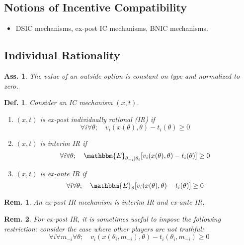 \documentclass[11pt,a4paper,dvipdfmx]{article}
\theoremstyle{plain}
\newtheorem{df}{Def.}[section]
\newtheorem{rem}{Rem.}[section]
\newtheorem{ass}{Ass.}
\newcommand{\E}{\mathbbm{E}}
\newcommand{\1}{\mathbbm{1}}
\begin{document}
\subsection{Notions of Incentive Compatibility}
\begin{itemize}
	\item DSIC mechanisms, ex-post IC mechanisms, BNIC mechanisms.
\end{itemize}

\subsection{Individual Rationality}
\begin{ass}
	The value of an outside option is constant on type and normalized to zero.
\end{ass}
\begin{df} Consider an IC mechanism $(x,t)$.
	\begin{enumerate}
		\item $(x,t)$ is ex-post individually rational (IR) if
		\[
		\forall i \forall \theta; \quad
		v_i(x(\theta), \theta) - t_i(\theta) \geq 0
		\]
		\item $(x,t)$ is interim IR if
		\[
		\forall i \forall \theta; \quad
		\E_{\theta_{-i} \mid \theta_i}[v_i(x(\theta), \theta) - t_i(\theta)] \geq 0
		\]
		\item $(x,t)$ is ex-ante IR if
		\[
		\forall i \forall \theta; \quad
		\E_{\theta}[v_i(x(\theta), \theta) - t_i(\theta)] \geq 0
		\]
	\end{enumerate}
\end{df}
\begin{rem}
	An ex-post IR mechanism is interim IR and ex-ante IR.
\end{rem}
\begin{rem}
	For ex-post IR, it is sometimes useful to impose the following restriction: consider the case where other players are not truthful:
	\[
	\forall i \forall m_{-i} \forall \theta; \quad
	v_i(x(\theta_i, m_{-i}), \theta) - t_i(\theta_i, m_{-i}) \geq 0
	\]
\end{rem}
\end{document}
